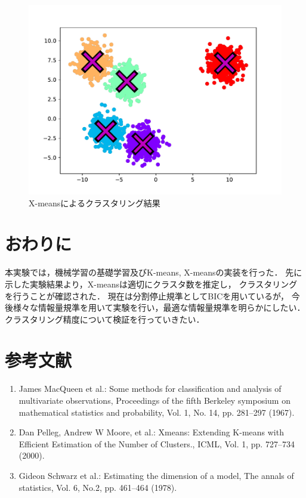 \documentclass[10pt,a4j,twocolumn]{ltjsarticle}
\begin{document}
\begin{figure}[htbp]
  \begin{center}
    \includegraphics[width=0.8\linewidth]{img/x-means/after.pdf}
    \caption{X-meansによるクラスタリング結果}
    \label{img:xmeans-after}
  \end{center}
\end{figure}

\section{おわりに}
本実験では，機械学習の基礎学習及びK-means, X-meansの実装を行った．
先に示した実験結果より，X-meansは適切にクラスタ数を推定し，
クラスタリングを行うことが確認された．
現在は分割停止規準としてBICを用いているが，
今後様々な情報量規準を用いて実験を行い，最適な情報量規準を明らかにしたい．
クラスタリング精度について検証を行っていきたい．

\section{参考文献}
\begin{enumerate}
\renewcommand{\labelenumi}{\arabic{enumi})}
  \item James MacQueen et al.:
    Some methods for classification and analysis of multivariate observations,
    Proceedings of the fifth Berkeley symposium on mathematical statistics and probability,
    Vol. 1, No. 14, pp. 281--297 (1967).
  \item Dan Pelleg, Andrew W Moore, et al.:
    Xmeans: Extending K-means with Efficient Estimation of the Number of Clusters.,
    ICML, Vol. 1, pp. 727--734 (2000).
  \item Gideon Schwarz et al.:
    Estimating the dimension of a model,
    The annals of statistics, Vol. 6, No.2, pp. 461--464 (1978).
\end{enumerate}
\end{document}

